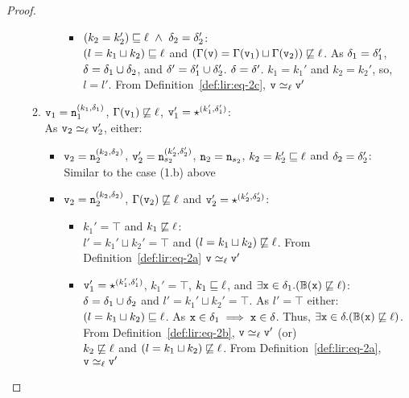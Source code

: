 \begin{proof}
\begin{itemize}[leftmargin=.5in]
\begin{enumerate}
\begin{enumerate}
\begin{itemize}
        \item $(k_2 = k_2') \sqsubseteq \ell ~\wedge~
          \delta_2 = \delta_2'$: \\
          $(l = k_1 \sqcup k_2) \sqsubseteq \ell$ and $(\Gamma(\texttt{v}) =
          \Gamma(\texttt{v}_1) \sqcup \Gamma(\texttt{v}_2) )  \not\sqsubseteq \ell$. As
          $\delta_1 = \delta_1'$, $\delta = \delta_1 \cup
          \delta_2$, and $\delta' = \delta_1' \cup \delta_2'$. $
          \delta = \delta'$. $k_1 = k_1'$ and $k_2 = k_2'$, so, $l =
          l'$. From Definition~\ref{def:lir:eq-2c}, $\texttt{v} \simeq_\ell  \texttt{v}'$ 
        \end{itemize}
      \end{enumerate}

    \item $\texttt{v}_1 = \texttt{n}_1^{(k_1, \delta_1)}$, $\Gamma(\texttt{v}_1) \not\sqsubseteq
      \ell$, $\texttt{v}_1' = \star^{(k_1',\delta_1')}$:  \\
      As $\texttt{v}_2 \simeq_\ell \texttt{v}_2'$, either: 
      
      \begin{itemize}
      \item $\texttt{v}_2 = \texttt{n}_2^{(k_2, \delta_2)}$, $\texttt{v}_2' = \texttt{n}_{s_2}^{(k_2', \delta_2')}$,
        $\texttt{n}_2 = \texttt{n}_{s_2}$, $k_2 = k_2' \sqsubseteq  \ell$ and $\delta_2
        = \delta_2'$: \\ Similar to the case (1.b) above 
        
      \item $\texttt{v}_2 = \texttt{n}_2^{(k_2, \delta_2)}$, $\Gamma(\texttt{v}_2) \not\sqsubseteq
        \ell$ and  $\texttt{v}_2' = \star^{(k_2',\delta_2')}$: 
        
        \begin{itemize}
        \item $k_1' = \top$ and $k_1 \not\sqsubseteq \ell$: \\
          $l' = k_1' \sqcup k_2' = \top$ and $(l = k_1 \sqcup
          k_2) \not\sqsubseteq \ell$. From
          Definition~\ref{def:lir:eq-2a} $\texttt{v} \simeq_\ell \texttt{v}'$ 

        \item  $\texttt{v}_1' = \star^{(k_1',\delta_1')}$, $k_1' = \top$, $k_1
          \sqsubseteq \ell$, and $\exists \texttt{x} \in
          \delta_1. (\mathbb{B}(\texttt{x}) \not\sqsubseteq \ell)$: \\
          $\delta = \delta_1 \cup \delta_2$ and $l' = k_1' \sqcup
          k_2' = \top$. As $l' = \top$ either: \\ 
          $(l = k_1 \sqcup k_2) \sqsubseteq \ell$. As $\texttt{x} \in
          \delta_1 \implies \texttt{x} \in \delta$. Thus, $\exists \texttt{x} \in
          \delta. (\mathbb{B}(\texttt{x}) \not\sqsubseteq \ell)$. From 
          Definition~\ref{def:lir:eq-2b}, $\texttt{v} \simeq_\ell \texttt{v}'$ (or) \\
          $ k_2 \not\sqsubseteq \ell$ and $(l = k_1 \sqcup
          k_2) \not\sqsubseteq \ell$. From
          Definition~\ref{def:lir:eq-2a}, $\texttt{v} \simeq_\ell \texttt{v}'$ 
          

\end{itemize}
\end{itemize}
\end{enumerate}
\end{itemize}
\end{proof}
